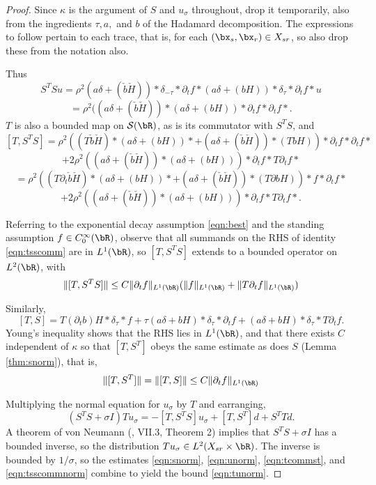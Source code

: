 \begin{proof}
  Since $\kappa$ is the argument of $S$ and $u_{\sigma}$ throughout, drop it
  temporarily, also from the ingredients $\tau, a, $ and $b$ of the
  Hadamard decomposition. The expressions to follow pertain to
  each trace, that is, for each $(\bx_s,\bx_r) \in X_{sr}$, so also drop these
  from the notation also.
  
  Thus
  \[
    S^TS u=
    \rho^2(a\delta  +  (\check{b}\check{H})) *\delta_{-\tau}*\partial_t
    f * (a\delta  +  (bH)) *\delta_{\tau}*\partial_t f*u
  \]
  \[
    = \rho^2((a\delta  +  (\check{b}\check{H}))*(a\delta  +
    (bH))*\partial_t f *\partial_t f*.
  \]
  $T$ is also a bounded map on $ {\cal S}(\bR)$, as is
  its commutator with $S^TS$, and 
  \[
    [T,S^TS] = \rho^2((T\check{b}\check{H}) *(a\delta  +
    (bH))*+ (a\delta  +  (\check{b}\check{H}))*(TbH))*\partial_t f
    *\partial_t f*
  \]
  \[
    +2\rho^2((a\delta  +  (\check{b}\check{H}))*(a\delta  +
    (bH)))* \partial_t f  *T\partial_t f*
  \]
  \[
    =\rho^2((T\partial_t\check{b}\check{H}) *(a\delta  +
    (bH))*+ (a\delta  +  (\check{b}\check{H}))*(T\partial bH))* f
    *\partial_t f*
   \]
  \begin{equation}
    \label{eqn:tsscomm}
     +2\rho^2((a\delta  +  (\check{b}\check{H}))*(a\delta  +
    (bH)))* \partial_t f  *T\partial_t f*.
  \end{equation}
  
  Referring to the exponential decay assumption \ref{eqn:best}
  and the standing assumption $f\in C_0^{\infty}(\bR)$, 
  observe that all summands on the RHS of identity \ref{eqn:tsscomm} are in
  $L^1(\bR)$, so $[T,S^TS]$ extends to a bounded
  operator on $L^2(\bR)$, with
  \begin{equation}
    \label{eqn:tsscommnorm}
    \|[T,S^TS]\| \le C\|\partial_t f\|_{L^1(\bR)}(\|f\|_{L^1(\bR)}+\|T\partial_tf\|_{L^1(\bR)})
  \end{equation}
  
  Similarly,
  \[
    [T,S]=T(\partial_t b)H*\delta_{\tau}*f + \tau(a\delta +
    bH)*\delta_{\tau}*\partial_t f + (a\delta +
    bH)*\delta_{\tau}*T\partial_t f.
  \]
  Young's inequality shows that the RHS lies in $L^1(\bR)$, and that there exists $C$ independent of $\kappa$ so that
  $[T,S^T]$ obeys the same estimate as does $S$ (Lemma
  \ref{thm:snorm}), that is,
  \begin{equation}
    \label{eqn:tcommst}  
    \|[T,S^T]\| = \|[T,S]\| \le C\|\partial_t f\|_{L^1(\bR)}
  \end{equation}
  
  Multiplying the normal equation for $u_{\sigma}$ by $T$ and earranging,
  \[
    (S^TS+\sigma I)Tu_{\sigma} = -[T,S^TS]u_{\sigma} + [T,S^T]d + S^TTd.
  \]
  A theorem of von Neumann (\cite{Yosida}, VII.3, Theorem 2) implies
  that $S^TS+\sigma I$ has a bounded inverse, so the distribution
  $Tu_{\sigma} \in L^2(X_{sr} \times \bR)$. The inverse is bounded by
  $1/\sigma$, so the estimates \ref{eqn:snorm}, \ref{eqn:unorm},
  \ref{eqn:tcommst}, and \ref{eqn:tsscommnorm} combine to yield the
  bound \ref{eqn:tunorm}.
  
\end{proof}

